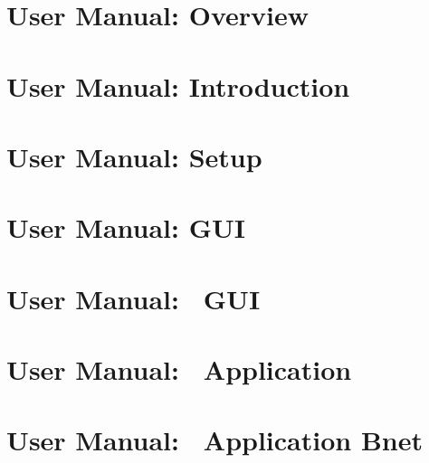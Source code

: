 \chapter[DABC User Manual: Overview]{\dabc\ User Manual: Overview}
 \cleardoublepage
\chapter[DABC User Manual: Introduction]{\dabc\ User Manual: Introduction}
 \cleardoublepage
\chapter[DABC User Manual: Setup]{\dabc\ User Manual: Setup}
 \cleardoublepage
\chapter[DABC User Manual: GUI]{\dabc\ User Manual: GUI}
 \cleardoublepage
\chapter[DABC User Manual: MBS GUI]{\dabc\ User Manual: \mbs\ GUI}
 \cleardoublepage
\chapter[DABC User Manual: DABC Application MBS]{\dabc\ User Manual: \dabc\ Application \mbs}
 \cleardoublepage
\chapter[DABC User Manual: DABC Application Bnet]{\dabc\ User Manual: \dabc\ Application Bnet}
 \cleardoublepage

